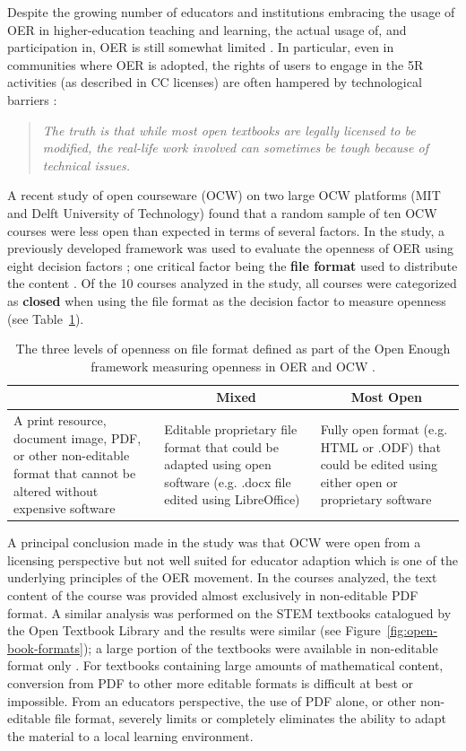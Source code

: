 \documentclass[11pt]{article}
\begin{document}
Despite the growing number of educators and institutions embracing the usage of OER in higher-education teaching and learning, the actual usage of, and participation in, OER is still somewhat limited \cite{MB:2022}.  In particular, even in communities where OER is adopted, the rights of users to engage in the 5R activities (as described in CC licenses) are often hampered by technological barriers \cite{CC:16, SO:19, MM-EC:19, CE:22}:
\begin{quote}\em
  The truth is that while most open textbooks are legally licensed to be modified, the real-life work involved can sometimes be tough because of technical issues. \cite{CC:16}
\end{quote}
A recent study of open courseware (OCW) on two large OCW platforms (MIT and Delft University of Technology) found that a random sample of ten OCW courses were less open than expected in terms of several factors.  In the study, a previously developed framework was used to evaluate the openness of OER using eight decision factors \cite{MM-EC:19}; one critical factor being the \textbf{file format} used to distribute the content \cite{CE:22}. Of the 10 courses analyzed in the study, all courses were categorized as \textbf{closed} when using the file format as the decision factor to measure openness (see Table~\ref{tab:open-enough}).
\begin{table}
\centering
\renewcommand{\arraystretch}{1.5}
\begin{tabular}{p{5cm}p{5cm}p{5cm}}\hline  
  \rowcolor{Gray}
  \multicolumn{1}{c}{\textbf{Closed}} & \multicolumn{1}{c}{\textbf{Mixed}} & \multicolumn{1}{c}{\textbf{Most Open}}\\ \hline 
A print resource, document image, PDF, or other non-editable format that cannot be altered without expensive software & Editable proprietary file format that could be adapted using open software (e.g. .docx file edited using LibreOffice) & Fully open format (e.g. HTML or .ODF) that could be edited using either open or proprietary software\\[1ex] \hline
\end{tabular}
\caption{The three levels of openness on file format defined as part of the Open Enough framework measuring openness in OER and OCW \cite{MM-EC:19}.}
\label{tab:open-enough}
\end{table}
A principal conclusion made in the study was that OCW were open from a licensing perspective but not well suited for educator adaption which is one of the underlying principles of the OER movement.  In the courses analyzed, the text content of the course was provided almost exclusively in non-editable PDF format.  A similar analysis was performed on the STEM textbooks catalogued by the Open Textbook Library and the results were similar (see Figure~\ref{fig:open-book-formats}); a large portion of the textbooks were available in non-editable format only \cite{CA:22}.  For textbooks containing large amounts of mathematical content, conversion from PDF to other more editable formats is difficult at best or impossible.  From an educators perspective, the use of PDF alone, or other non-editable file format, severely limits or completely eliminates the ability to adapt the material to a local learning environment.
\end{document}
